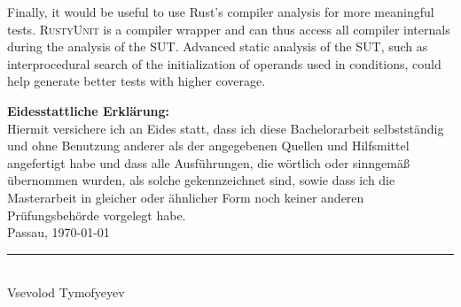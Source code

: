 \documentclass[paper=a4,%
  twoside,%
  BCOR4mm,%
  abstract=true,%
  toc=bibliography,%
  chapterprefix=true,%
  toc=bibliographynumbered,%
  open=right,%
  english,%
  pagesize=pdftex]{scrreprt}
\newcommand{\tech}{\textsc{RustyUnit}\xspace}
\begin{document}
Finally, it would be useful to use Rust's compiler analysis for more meaningful tests. \tech is a compiler wrapper and can thus access all compiler internals during the analysis of the \ac{SUT}. Advanced static analysis of the \ac{SUT}, such as interprocedural search of the initialization of operands used in conditions, could help generate better tests with higher coverage. 


\backmatter%
\appendix
\cleardoublepage
\thispagestyle{empty}
\null\vfill
\noindent\textbf{Eidesstattliche Erklärung:}\\[1.5ex]
Hiermit versichere ich an Eides statt, dass ich diese Bachelorarbeit
selbstständig und ohne Benutzung anderer als der angegebenen Quellen und
Hilfsmittel angefertigt habe und dass alle Ausführungen, die wörtlich oder
sinngemäß übernommen wurden, als solche gekennzeichnet sind, sowie dass ich die
Masterarbeit in gleicher oder ähnlicher Form noch keiner anderen
Prüfungsbehörde vorgelegt habe.\\[1.5cm]
Passau, \today\quad\rule{6cm}{0.1mm}\\
\null\hspace{5cm} {\small Vsevolod Tymofyeyev}

\clearpage


\clearpage
\printbibliography
\end{document}
